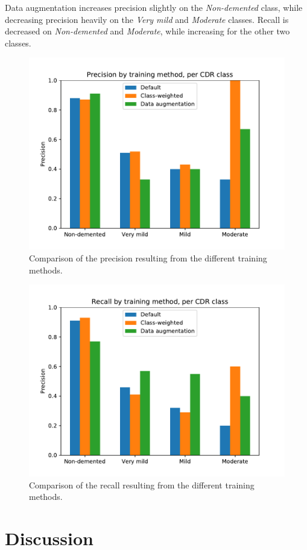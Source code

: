 \documentclass{kththesis}
\begin{document}
Data augmentation increases precision slightly on the \textit{Non-demented} class, while decreasing precision heavily on the \textit{Very mild} and \textit{Moderate} classes. Recall is decreased on \textit{Non-demented} and \textit{Moderate}, while increasing for the other two classes.
\newpage

\begin{figure}[H]
  \centering
  \includegraphics[width=0.8\linewidth]{img/precision_comparison.pdf}
  \caption{Comparison of the precision resulting from the different training methods.} \label{fig:precision_comparison}
\end{figure}
\begin{figure}[H]
  \centering
  \includegraphics[width=0.8\linewidth]{img/recall_comparison.pdf}
  \caption{Comparison of the recall resulting from the different training methods.} \label{fig:recall_comparison}
\end{figure}

\chapter{Discussion}
\end{document}
